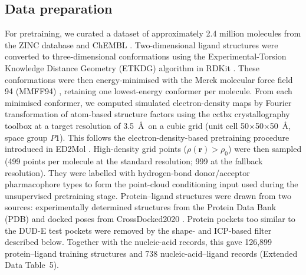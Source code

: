 \documentclass[pdflatex,sn-mathphys-num]{sn-jnl}
\theoremstyle{thmstyleone}
\theoremstyle{thmstyletwo}
\theoremstyle{thmstylethree}
\begin{document}
\subsection{Data preparation}

For pretraining, we curated a dataset of approximately 2.4 million molecules from the ZINC database \cite{irwin2020zinc20} and ChEMBL \cite{zdrazil2024chembl}. Two-dimensional ligand structures were converted to three-dimensional conformations using the Experimental-Torsion Knowledge Distance Geometry (ETKDG) algorithm \cite{riniker2015etkdg} in RDKit \cite{landrum2024rdkit}. These conformations were then energy-minimised with the Merck molecular force field 94 (MMFF94) \cite{halgren1996mmff}, retaining one lowest-energy conformer per molecule. From each minimised conformer, we computed simulated electron-density maps by Fourier transformation of atom-based structure factors using the cctbx crystallography toolbox \cite{grossekunstleve2002cctbx} at a target resolution of 3.5~\AA\ on a cubic grid (unit cell 50$\times$50$\times$50~\AA, space group $P1$). This follows the electron-density-based pretraining procedure introduced in ED2Mol \cite{ed2mol2025}. High-density grid points ($\rho(\mathbf{r}) > \rho_0$) were then sampled (499 points per molecule at the standard resolution; 999 at the fallback resolution). They were labelled with hydrogen-bond donor/acceptor pharmacophore types to form the point-cloud conditioning input used during the unsupervised pretraining stage. Protein--ligand structures were drawn from two sources: experimentally determined structures from the Protein Data Bank (PDB) \cite{berman2000pdb} and docked poses from CrossDocked2020 \cite{francoeur2020crossdocked}. Protein pockets too similar to the DUD-E test pockets were removed by the shape- and ICP-based filter described below. Together with the nucleic-acid records, this gave 126,899 protein--ligand training structures and 738 nucleic-acid--ligand records (Extended Data Table~5).
\end{document}
